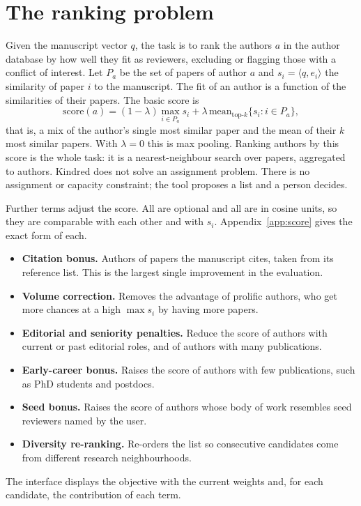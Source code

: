 \documentclass[11pt]{article}
\begin{document}
\section{The ranking problem}
Given the manuscript vector $q$, the task is to rank the authors $a$ in the author database by how well they fit as reviewers, excluding or flagging those with a conflict of interest. Let $P_a$ be the set of papers of author $a$ and $s_i = \langle q, e_i\rangle$ the similarity of paper $i$ to the manuscript. The fit of an author is a function of the similarities of their papers. The basic score is
\[
  \mathrm{score}(a) = (1-\lambda)\max_{i\in P_a} s_i + \lambda\,\mathrm{mean}_{\text{top-}k}\{s_i : i\in P_a\},
\]
that is, a mix of the author's single most similar paper and the mean of their $k$ most similar papers. With $\lambda=0$ this is max pooling. Ranking authors by this score is the whole task: it is a nearest-neighbour search over papers, aggregated to authors. Kindred does not solve an assignment problem. There is no assignment or capacity constraint; the tool proposes a list and a person decides.

Further terms adjust the score. All are optional and all are in cosine units, so they are comparable with each other and with $s_i$. Appendix~\ref{app:score} gives the exact form of each.
\begin{itemize}
\item \textbf{Citation bonus.} Authors of papers the manuscript cites, taken from its reference list. This is the largest single improvement in the evaluation.
\item \textbf{Volume correction.} Removes the advantage of prolific authors, who get more chances at a high $\max s_i$ by having more papers.
\item \textbf{Editorial and seniority penalties.} Reduce the score of authors with current or past editorial roles, and of authors with many publications.
\item \textbf{Early-career bonus.} Raises the score of authors with few publications, such as PhD students and postdocs.
\item \textbf{Seed bonus.} Raises the score of authors whose body of work resembles seed reviewers named by the user.
\item \textbf{Diversity re-ranking.} Re-orders the list so consecutive candidates come from different research neighbourhoods.
\end{itemize}
The interface displays the objective with the current weights and, for each candidate, the contribution of each term.
\end{document}

